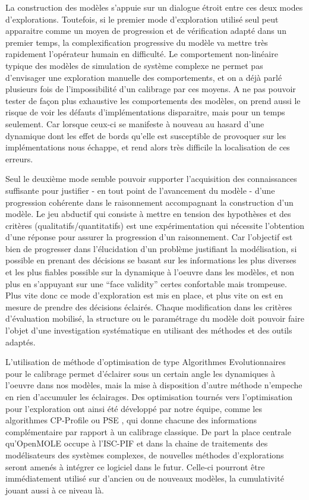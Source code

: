 La construction des modèles s'appuie sur un dialogue étroit entre ces deux modes d'explorations. Toutefois, si le premier mode d'exploration utilisé seul peut apparaitre comme un moyen de progression et de vérification adapté dans un premier temps, la complexification progressive du modèle va mettre très rapidement l'opérateur humain en difficulté. Le comportement non-linéaire typique des modèles de simulation de système complexe ne permet pas d'envisager une exploration manuelle des comportements, et on a déjà parlé plusieurs fois de l'impossibilité d'un calibrage par ces moyens. A ne pas pouvoir tester de façon plus exhaustive les comportements des modèles, on prend aussi le risque de voir les défauts d'implémentations disparaitre, mais pour un temps seulement. Car lorsque ceux-ci se manifeste à nouveau au hasard d'une dynamique dont les effet de bords qu'elle est susceptible de provoquer sur les implémentations nous échappe, et rend alors très difficile la localisation de ces erreurs. 

Seul le deuxième mode semble pouvoir supporter l'acquisition des connaissances suffisante pour justifier - en tout point de l'avancement du modèle - d'une progression cohérente dans le raisonnement accompagnant la construction d'un modèle. Le jeu abductif qui consiste à mettre en tension des hypothèses et des critères (qualitatifs/quantitatifs)  est une expérimentation qui nécessite l'obtention d'une réponse pour assurer la progression d'un raisonnement. Car l'objectif est bien de progresser dans l'élucidation d'un problème justifiant la modélisation, si possible en prenant des décisions se basant sur les informations les plus diverses et les plus fiables possible sur la dynamique à l'oeuvre dans les modèles, et non plus en s'appuyant sur une \foreignquote{english}{face validity} certes confortable mais trompeuse. Plus vite donc ce mode d'exploration est mis en place, et plus vite on est en mesure de prendre des décisions éclairés. Chaque modification dans les critères d'évaluation mobilisé, la structure ou le paramétrage du modèle doit pouvoir faire l'objet d'une investigation systématique en utilisant des méthodes et des outils adaptés. 

L'utilisation de méthode d'optimisation de type Algorithmes Evolutionnaires pour le calibrage permet d'éclairer sous un certain angle les dynamiques à l'oeuvre dans nos modèles, mais la mise à disposition d'autre méthode n'empeche en rien d'accumuler les éclairages. Des optimisation tournés vers l'optimisation pour l'exploration ont ainsi été développé par notre équipe, comme les algorithmes CP-Profile \autocite{Reuillon2015} ou PSE \autocite{Cherel2015}, qui donne chacune des informations complémentaire par rapport à un calibrage classique. De part la place centrale qu'OpenMOLE occupe à l'ISC-PIF et dans la chaine de traitements des modélisateurs des systèmes complexes, de nouvelles méthodes d'explorations seront amenés à intégrer ce logiciel dans le futur. Celle-ci pourront être immédiatement utilisé sur d'ancien ou de nouveaux modèles, la cumulativité jouant aussi à ce niveau là.

